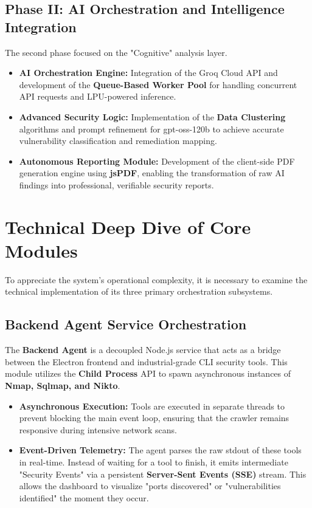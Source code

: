 \documentclass[12pt,oneside,a4paper]{book}
\begin{document}
\subsection{Phase II: AI Orchestration and Intelligence Integration}
The second phase focused on the "Cognitive" analysis layer.
\begin{itemize}
  \item \textbf{AI Orchestration Engine:} Integration of the Groq Cloud API and development of the \textbf{Queue-Based Worker Pool} for handling concurrent API requests and LPU-powered inference.
  \item \textbf{Advanced Security Logic:} Implementation of the \textbf{Data Clustering} algorithms and prompt refinement for gpt-oss-120b to achieve accurate vulnerability classification and remediation mapping.
  \item \textbf{Autonomous Reporting Module:} Development of the client-side PDF generation engine using \textbf{jsPDF}, enabling the transformation of raw AI findings into professional, verifiable security reports.
\end{itemize}

\section{Technical Deep Dive of Core Modules}

To appreciate the system's operational complexity, it is necessary to examine the technical implementation of its three primary orchestration subsystems.

\subsection{Backend Agent Service Orchestration}
The \textbf{Backend Agent} is a decoupled Node.js service that acts as a bridge between the Electron frontend and industrial-grade CLI security tools. This module utilizes the \textbf{Child Process} API to spawn asynchronous instances of \textbf{Nmap, Sqlmap, and Nikto}. 
\begin{itemize}
    \item \textbf{Asynchronous Execution:} Tools are executed in separate threads to prevent blocking the main event loop, ensuring that the crawler remains responsive during intensive network scans.
    \item \textbf{Event-Driven Telemetry:} The agent parses the raw stdout of these tools in real-time. Instead of waiting for a tool to finish, it emits intermediate "Security Events" via a persistent \textbf{Server-Sent Events (SSE)} stream. This allows the dashboard to visualize "ports discovered" or "vulnerabilities identified" the moment they occur.
\end{itemize}
\end{document}
